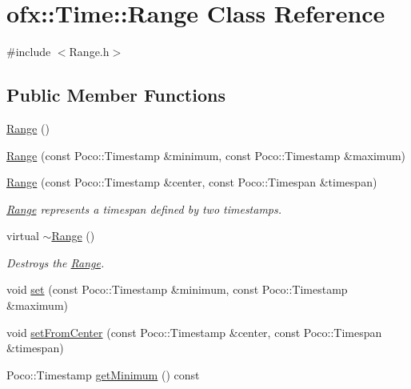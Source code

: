 \hypertarget{classofx_1_1_time_1_1_range}{\section{ofx\-:\-:Time\-:\-:Range Class Reference}
\label{classofx_1_1_time_1_1_range}
}


{\ttfamily \#include $<$Range.\-h$>$}

\subsection*{Public Member Functions}
\begin{DoxyCompactItemize}
\item 
\hyperlink{classofx_1_1_time_1_1_range_a9e663229b827ec8ad57c8df563cdd8d4}{Range} ()
\item 
\hyperlink{classofx_1_1_time_1_1_range_a567148ab9e653f6f44d9c54c15a990e4}{Range} (const Poco\-::\-Timestamp \&minimum, const Poco\-::\-Timestamp \&maximum)
\item 
\hypertarget{classofx_1_1_time_1_1_range_a700489127e65341dba5a5be370869093}{\hyperlink{classofx_1_1_time_1_1_range_a700489127e65341dba5a5be370869093}{Range} (const Poco\-::\-Timestamp \&center, const Poco\-::\-Timespan \&timespan)}\label{classofx_1_1_time_1_1_range_a700489127e65341dba5a5be370869093}

\begin{DoxyCompactList}\small\item\em \hyperlink{classofx_1_1_time_1_1_range}{Range} represents a timespan defined by two timestamps. \end{DoxyCompactList}\item 
\hypertarget{classofx_1_1_time_1_1_range_a98398649e52a13a515b3c5cb13074c06}{virtual \hyperlink{classofx_1_1_time_1_1_range_a98398649e52a13a515b3c5cb13074c06}{$\sim$\-Range} ()}\label{classofx_1_1_time_1_1_range_a98398649e52a13a515b3c5cb13074c06}

\begin{DoxyCompactList}\small\item\em Destroys the \hyperlink{classofx_1_1_time_1_1_range}{Range}. \end{DoxyCompactList}\item 
void \hyperlink{classofx_1_1_time_1_1_range_ade613f6f9bf9db11ec5d7319cdffbffe}{set} (const Poco\-::\-Timestamp \&minimum, const Poco\-::\-Timestamp \&maximum)
\item 
void \hyperlink{classofx_1_1_time_1_1_range_a1c3e59b3f97002b969e4e703c1c2247b}{set\-From\-Center} (const Poco\-::\-Timestamp \&center, const Poco\-::\-Timespan \&timespan)
\item 
\hypertarget{classofx_1_1_time_1_1_range_ad8d3b7bd18cdce6b227f98191fca53f0}{Poco\-::\-Timestamp \hyperlink{classofx_1_1_time_1_1_range_ad8d3b7bd18cdce6b227f98191fca53f0}{get\-Minimum} () const }\label{classofx_1_1_time_1_1_range_ad8d3b7bd18cdce6b227f98191fca53f0}


\end{DoxyCompactItemize}

